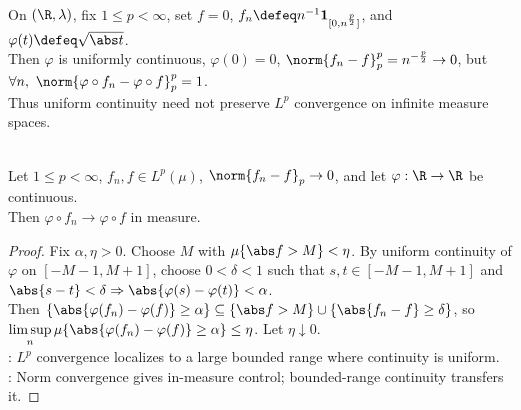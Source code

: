 \begin{example} \label{ex:uniform-continuity-composition-lp-needs-finite-measure} \\
On $(\R,\lambda)$, fix $1\leq p<\infty$, set $f=0$, $f_n\defeq n^{-1}\mathbf{1}_{[0,n^{\frac{p}{2}}]}$, and $\varphi(t)\defeq\sqrt{\abs t}$.\\
Then $\varphi$ is uniformly continuous, $\varphi(0)=0$, $\norm{f_n-f}_p^p=n^{-\frac{p}{2}}\to0$, but $\forall n,\ \norm{\varphi\circ f_n-\varphi\circ f}_p^p=1$.\\
Thus uniform continuity need not preserve $L^p$ convergence on infinite measure spaces.
\end{example}

\begin{lemma} \label{lem:lp-convergence-continuous-composition-in-measure} \\
Let $1\leq p<\infty$, $f_n,f\in L^p(\mu)$, $\norm{f_n-f}_p\to0$, and let $\varphi:\R\to\R$ be continuous.\\
Then $\varphi\circ f_n\to\varphi\circ f$ in measure.
\begin{proof}
Fix $\alpha,\eta>0$. Choose $M$ with $\mu\{\abs f>M\}<\eta$. By uniform continuity of $\varphi$ on $[-M-1,M+1]$, choose $0<\delta<1$ such that $s,t\in[-M-1,M+1]$ and $\abs{s-t}<\delta\Rightarrow\abs{\varphi(s)-\varphi(t)}<\alpha$.\\
Then $\{\abs{\varphi(f_n)-\varphi(f)}\geq\alpha\}\subseteq\{\abs f>M\}\cup\{\abs{f_n-f}\geq\delta\}$, so $\limsup\limits_n\mu\{\abs{\varphi(f_n)-\varphi(f)}\geq\alpha\}\leq\eta$. Let $\eta\downarrow0$.\\
: $L^p$ convergence localizes to a large bounded range where continuity is uniform.\\
: Norm convergence gives in-measure control; bounded-range continuity transfers it.
\end{proof}
\end{lemma}

